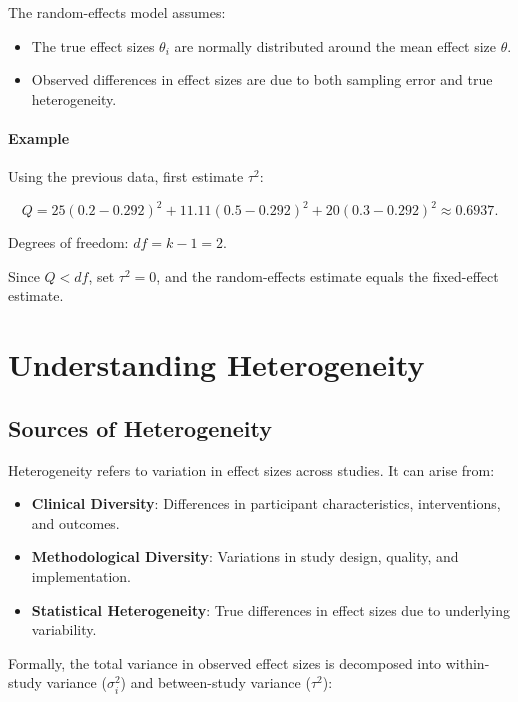 \documentclass[12pt,a4paper]{report}
\begin{document}
The random-effects model assumes:

\begin{itemize}
    \item The true effect sizes $\theta_i$ are normally distributed around the mean effect size $\theta$.
    \item Observed differences in effect sizes are due to both sampling error and true heterogeneity.
\end{itemize}

\subsubsection{Example}
\label{subsubsec:random_example}

Using the previous data, first estimate $\tau^2$:

\[
Q = 25(0.2 - 0.292)^2 + 11.11(0.5 - 0.292)^2 + 20(0.3 - 0.292)^2 \approx 0.6937.
\]

Degrees of freedom: $df = k - 1 = 2$.

Since $Q < df$, set $\tau^2 = 0$, and the random-effects estimate equals the fixed-effect estimate.

\chapter{Understanding Heterogeneity}
\label{chap:heterogeneity}

\section{Sources of Heterogeneity}
\label{sec:sources_heterogeneity}

Heterogeneity refers to variation in effect sizes across studies. It can arise from:

\begin{itemize}
    \item \textbf{Clinical Diversity}: Differences in participant characteristics, interventions, and outcomes.
    \item \textbf{Methodological Diversity}: Variations in study design, quality, and implementation.
    \item \textbf{Statistical Heterogeneity}: True differences in effect sizes due to underlying variability.
\end{itemize}

Formally, the total variance in observed effect sizes is decomposed into within-study variance ($\sigma_i^2$) and between-study variance ($\tau^2$):
\end{document}
